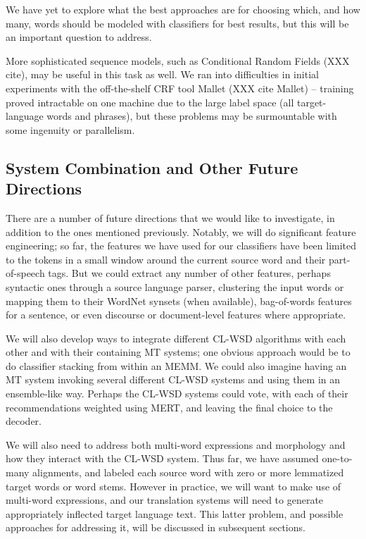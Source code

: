 We have yet to explore what the best approaches are for choosing which, and how
many, words should be modeled with classifiers for best results, but this will
be an important question to address.

More sophisticated sequence models, such as Conditional Random Fields (XXX
cite), may be useful in this task as well. 
We ran into difficulties in initial experiments with the off-the-shelf
CRF tool Mallet (XXX cite Mallet) -- training proved intractable on
one machine due to the large label space (all target-language words and
phrases), but these problems may be surmountable with some ingenuity or
parallelism.

\subsection{System Combination and Other Future Directions}

There are a number of future directions that we would like to investigate, in
addition to the ones mentioned previously.
Notably, we will do significant feature engineering; so far, the features we
have used for our classifiers have been limited to the tokens in a small window
around the current source word and their part-of-speech tags.
But we could extract any number of other features, perhaps syntactic ones
through a source language parser, clustering the input words or mapping them to
their WordNet synsets (when available), bag-of-words features for a sentence,
or even discourse or document-level features where appropriate.

We will also develop ways to integrate different CL-WSD algorithms with each
other and with their containing MT systems; one obvious approach would be to do
classifier stacking from within an MEMM.
We could also imagine having an MT system invoking several different CL-WSD
systems and using them in an ensemble-like way.
Perhaps the CL-WSD systems could vote, with each of their recommendations
weighted using MERT, and leaving the final choice to the decoder.

We will also need to address both multi-word expressions and morphology and how
they interact with the CL-WSD system.
Thus far, we have assumed one-to-many alignments, and labeled each source word
with zero or more lemmatized target words or word stems.
However in practice, we will want to make use of multi-word expressions, and
our translation systems will need to generate appropriately inflected target
language text. This latter problem, and possible approaches for addressing it,
will be discussed in subsequent sections.

